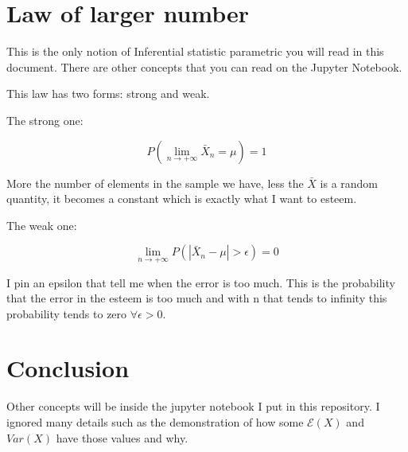\documentclass{article}
\begin{document}
\section{Law of larger number}

This is the only notion of Inferential statistic parametric you will read in this document. There are other concepts that you can read on the Jupyter Notebook.

This law has two forms: strong and weak.

\bigskip

The strong one:

$$P\left(\lim_{n \rightarrow + \infty} \bar X_n =\mu\right) = 1$$

More the number of elements in the sample we have, less the $\bar X$ is a random quantity, it becomes a constant which is exactly what I want to esteem.


\bigskip

The weak one:

$$\lim_{n \rightarrow + \infty} P\left(|\bar X_n - \mu| > \epsilon\right) = 0$$

I pin an epsilon that tell me when the error is too much. This is the probability that the error in the esteem is too much and with n that tends to infinity this probability tends to zero $\forall \epsilon > 0$.

\section{Conclusion}

Other concepts will be inside the jupyter notebook I put in this repository.
I ignored many details such as the demonstration of how some $\mathcal E(X)$ and $Var(X)$ have those values and why.
\end{document}
